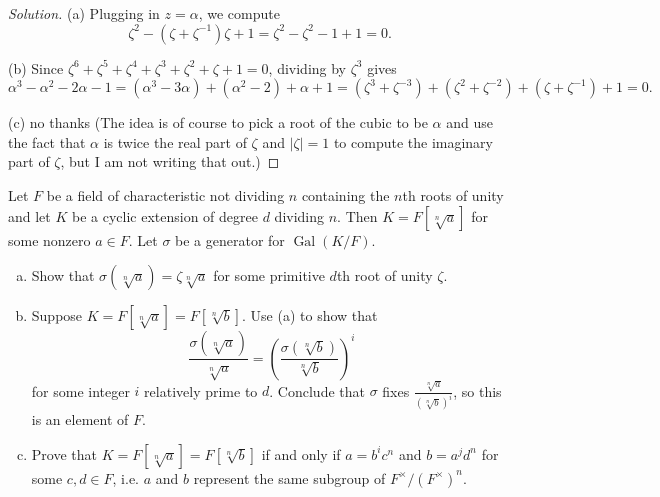 \documentclass[10pt]{article}
\providecommand{\Gal}{\operatorname{Gal}}
\providecommand{\ii}{\item}
\providecommand{\inv}{^{-1}}
\newenvironment{soln}{\begin{proof}[Solution]}{\end{proof}}
\providecommand{\abs}[1]{\left\lvert #1\right\rvert}
\begin{document}
\begin{soln}
    (a) Plugging in $z = \alpha$, we compute
    \begin{equation*}
        \zeta^2 - (\zeta + \zeta\inv)\zeta + 1
	= \zeta^2 - \zeta^2 - 1 + 1 = 0.
    \end{equation*}

    (b) Since $\zeta^6 + \zeta^5 + \zeta^4 + \zeta^3
    + \zeta^2 + \zeta + 1 = 0$, dividing by $\zeta^3$ gives
    \begin{equation*}
	\alpha^3 - \alpha^2 - 2\alpha - 1
	= (\alpha^3 - 3\alpha)
	+ (\alpha^2 - 2)
	+ \alpha + 1
	= (\zeta^3 + \zeta^{-3}) + (\zeta^2 + \zeta^{-2}) +
	(\zeta + \zeta\inv) + 1 = 0.
    \end{equation*}

    (c) no thanks
    (The idea is of course to pick a root of the cubic to be $\alpha$
    and use the fact that $\alpha$ is twice the real part of $\zeta$
    and $\abs\zeta = 1$ to compute the imaginary part of $\zeta$,
    but I am not writing that out.)
\end{soln}

\pagebreak
\begin{problem}
    [\S14.7\#7]
    Let $F$ be a field of characteristic not dividing $n$
    containing the $n$th roots of unity
    and let $K$ be a cyclic extension of degree $d$ dividing $n$.
    Then $K = F[\sqrt[n] a]$ for some nonzero $a\in F$.
    Let $\sigma$ be a generator for $\Gal(K/F)$.
    \begin{enumerate}[(a)]
	\ii Show that $\sigma(\sqrt[n]a) = \zeta\sqrt[n]a$
	for some primitive $d$th root of unity $\zeta$.
	\ii Suppose $K = F[\sqrt[n]a] = F[\sqrt[n]b]$.
	Use (a) to show that
	\[
	    \frac{\sigma(\sqrt[n]a)}{\sqrt[n]a}
	    = \left(\frac{\sigma(\sqrt[n]b)}{\sqrt[n]b}\right)^i
	\]
	for some integer $i$ relatively prime to $d$.
	Conclude that $\sigma$ fixes
	$\frac{\sqrt[n]a}{(\sqrt[n]b)^i}$,
	so this is an element of $F$.
	\ii Prove that $K = F[\sqrt[n]a] = F[\sqrt[n]b]$
	if and only if $a = b^ic^n$
	and $b = a^jd^n$ for some $c,d\in F$,
	i.e. $a$ and $b$ represent the same subgroup
	of $F^\times/(F^\times)^n$.
    \end{enumerate}
\end{problem}
\end{document}
